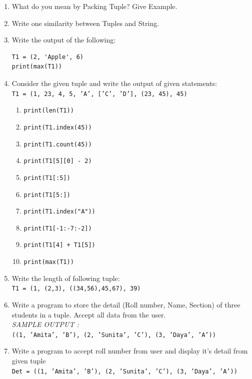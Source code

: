 \documentclass[11pt,a4paper]{article}
\begin{document}
\begin{enumerate}[label=\textbf{Q\arabic*.}]
\item What do you mean by Packing Tuple? Give Example.

\item Write one similarity between Tuples and String.

\item Write the output of the following:
\begin{lstlisting}
T1 = (2, 'Apple', 6)
print(max(T1))
\end{lstlisting}

\item Consider the given tuple and write the output of given statements:\\
\texttt{T1 = (1, 23, 4, 5, 'A', ['C', 'D'], (23, 45), 45)}
\begin{enumerate}
    \item \texttt{print(len(T1))}
    \item \texttt{print(T1.index(45))}
    \item \texttt{print(T1.count(45))}
    \item \texttt{print(T1[5][0] - 2)}   %
    \item \texttt{print(T1[:5])}
    \item \texttt{print(T1[5:])}
    \item \texttt{print(T1.index("A"))}
    \item \texttt{print(T1[-1:-7:-2])}
    \item \texttt{print(T1[4] + T1[5])}
    \item \texttt{print(max(T1))}
\end{enumerate}

\item Write the length of following tuple:\\
\texttt{T1 = (1, (2,3), ((34,56),45,67), 39)}

\item Write a program to store the detail (Roll number, Name, Section) of three students in a tuple. Accept all data from the user.\\
\textit{SAMPLE OUTPUT :}\\
\texttt{((1, 'Amita', 'B'), (2, 'Sunita', 'C'), (3, 'Daya', 'A'))}

\item Write a program to accept roll number from user and display it's detail from given tuple\\
\texttt{Det = ((1, 'Amita', 'B'), (2, 'Sunita', 'C'), (3, 'Daya', 'A'))}


\end{enumerate}
\end{document}
